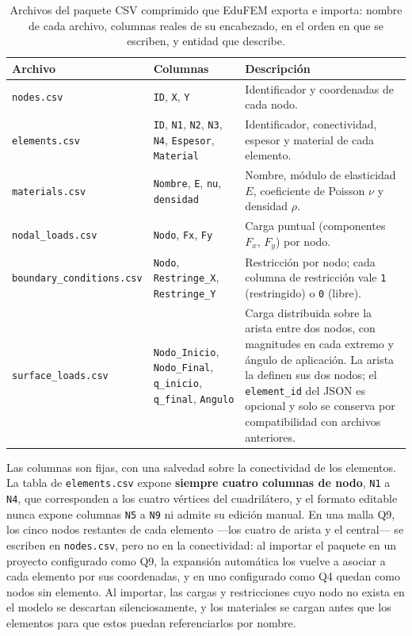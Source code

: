 \begin{table}[htbp]
\centering
\caption[Archivos CSV del paquete de modelo y sus columnas.]{Archivos del paquete CSV comprimido que EduFEM exporta e importa: nombre de cada archivo, columnas reales de su encabezado, en el orden en que se escriben, y entidad que describe.}
\label{tab:csv-archivos}
\begin{tabular}{p{3.6cm} p{5.0cm} p{4.6cm}}
\toprule
\textbf{Archivo} & \textbf{Columnas} & \textbf{Descripción} \\
\midrule
\texttt{nodes.csv} & \texttt{ID}, \texttt{X}, \texttt{Y} & Identificador y coordenadas de cada nodo. \\
\texttt{elements.csv} & \texttt{ID}, \texttt{N1}, \texttt{N2}, \texttt{N3}, \texttt{N4}, \texttt{Espesor}, \texttt{Material} & Identificador, conectividad, espesor y material de cada elemento. \\
\texttt{materials.csv} & \texttt{Nombre}, \texttt{E}, \texttt{nu}, \texttt{densidad} & Nombre, módulo de elasticidad $E$, coeficiente de Poisson $\nu$ y densidad $\rho$. \\
\texttt{nodal\_loads.csv} & \texttt{Nodo}, \texttt{Fx}, \texttt{Fy} & Carga puntual (componentes $F_x$, $F_y$) por nodo. \\
\texttt{boundary\_conditions}\newline\texttt{.csv} & \texttt{Nodo}, \texttt{Restringe\_X}, \texttt{Restringe\_Y} & Restricción por nodo; cada columna de restricción vale \texttt{1} (restringido) o \texttt{0} (libre). \\
\texttt{surface\_loads}\newline\texttt{.csv} & \texttt{Nodo\_Inicio}, \texttt{Nodo\_Final}, \texttt{q\_inicio}, \texttt{q\_final}, \texttt{Angulo} & Carga distribuida sobre la arista entre dos nodos, con magnitudes en cada extremo y ángulo de aplicación. La arista la definen sus dos nodos; el \texttt{element\_id} del JSON es opcional y solo se conserva por compatibilidad con archivos anteriores. \\
\bottomrule
\end{tabular}
\end{table}

Las columnas son fijas, con una salvedad sobre la conectividad de los elementos. La tabla de \texttt{elements.csv} expone \textbf{siempre cuatro columnas de nodo}, \texttt{N1} a \texttt{N4}, que corresponden a los cuatro vértices del cuadrilátero, y el formato editable nunca expone columnas \texttt{N5} a \texttt{N9} ni admite su edición manual. En una malla Q9, los cinco nodos restantes de cada elemento ---los cuatro de arista y el central--- se escriben en \texttt{nodes.csv}, pero no en la conectividad: al importar el paquete en un proyecto configurado como Q9, la expansión automática los vuelve a asociar a cada elemento por sus coordenadas, y en uno configurado como Q4 quedan como nodos sin elemento. Al importar, las cargas y restricciones cuyo nodo no exista en el modelo se descartan silenciosamente, y los materiales se cargan antes que los elementos para que estos puedan referenciarlos por nombre.

